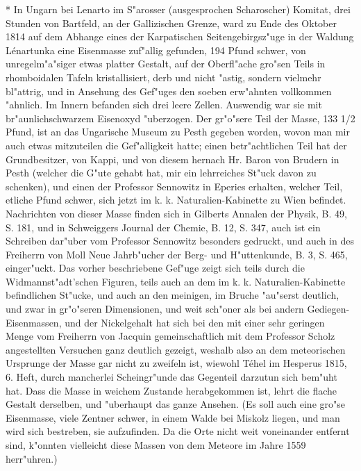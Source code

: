 \documentclass[a4paper, 11pt, oneside, polutonikogreek, german]{article}
\begin{document}
* In Ungarn bei Lenarto im S"arosser (ausgesprochen Scharoscher) Komitat, drei Stunden von Bartfeld, an der Gallizischen Grenze, ward zu Ende des Oktober 1814 auf dem Abhange eines der Karpatischen Seitengebirgsz"uge in der Waldung Lénartunka eine Eisenmasse zuf"allig gefunden, 194 Pfund schwer, von unregelm"a"siger etwas platter Gestalt, auf der Oberfl"ache gro"sen Teils in rhomboidalen Tafeln kristallisiert, derb und nicht "astig, sondern vielmehr bl"attrig, und in Ansehung des Gef"uges den soeben erw"ahnten vollkommen "ahnlich. Im Innern befanden sich drei leere Zellen. Auswendig war sie mit br"aunlichschwarzem Eisenoxyd "uberzogen. Der gr"o"sere Teil der Masse, 133 1/2 Pfund, ist an das Ungarische Museum zu Pesth gegeben worden, wovon man mir auch etwas mitzuteilen die Gef"alligkeit hatte; einen betr"achtlichen Teil hat der Grundbesitzer, von Kappi, und von diesem hernach Hr. Baron von Brudern in Pesth (welcher die G"ute gehabt hat, mir ein lehrreiches St"uck davon zu schenken), und einen der Professor Sennowitz in Eperies erhalten, welcher Teil, etliche Pfund schwer, sich jetzt im k. k. Naturalien-Kabinette zu Wien befindet. Nachrichten von dieser Masse finden sich in Gilberts Annalen der Physik, B. 49, S. 181, und in Schweiggers Journal der Chemie, B. 12, S. 347, auch ist ein Schreiben dar"uber vom Professor Sennowitz besonders gedruckt, und auch in des Freiherrn von Moll Neue Jahrb"ucher der Berg- und H"uttenkunde, B. 3, S. 465, einger"uckt. Das vorher beschriebene Gef"uge zeigt sich teils durch die Widmannst"adt'schen Figuren, teils auch an dem im k. k. Naturalien-Kabinette befindlichen St"ucke, und auch an den meinigen, im Bruche "au"serst deutlich, und zwar in gr"o"seren Dimensionen, und weit sch"oner als bei andern Gediegen-Eisenmassen, und der Nickelgehalt hat sich bei den mit einer sehr geringen Menge vom Freiherrn von Jacquin gemeinschaftlich mit dem Professor Scholz angestellten Versuchen ganz deutlich gezeigt, weshalb also an dem meteorischen Ursprunge der Masse gar nicht zu zweifeln ist, wiewohl Téhel im Hesperus 1815, 6. Heft, durch mancherlei Scheingr"unde das Gegenteil darzutun sich bem"uht hat. Dass die Masse in weichem Zustande herabgekommen ist, lehrt die flache Gestalt derselben, und "uberhaupt das ganze Ansehen. (Es soll auch eine gro"se Eisenmasse, viele Zentner schwer, in einem Walde bei Miskolz liegen, und man wird sich bestreben, sie aufzufinden. Da die Orte nicht weit voneinander entfernt sind, k"onnten vielleicht diese Massen von dem Meteore im Jahre 1559 herr"uhren.)
\end{document}

